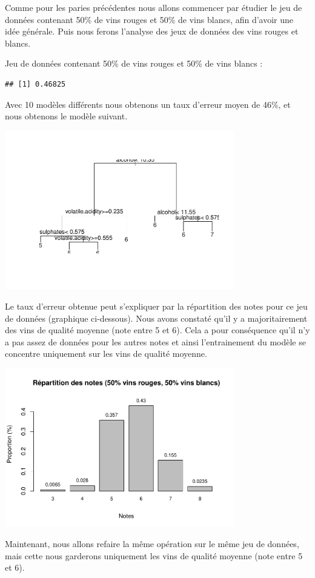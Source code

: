 \documentclass[
]{article}
\begin{document}
Comme pour les paries précédentes nous allons commencer par étudier le
jeu de données contenant 50\% de vins rouges et 50\% de vins blancs,
afin d'avoir une idée générale. Puis nous ferons l'analyse des jeux de
données des vins rouges et blancs.

Jeu de données contenant 50\% de vins rouges et 50\% de vins blancs :

\begin{verbatim}
## [1] 0.46825
\end{verbatim}

Avec 10 modèles différents nous obtenons un taux d'erreur moyen de 46\%,
et nous obtenons le modèle suivant.

\begin{center}
	\includegraphics[width=10cm]{repport_files/figure-latex/unnamed-chunk-17-1.pdf}
\end{center}

Le taux d'erreur obtenue peut s'expliquer par la répartition des notes
pour ce jeu de données (graphique ci-dessous). Nous avons constaté qu'il
y a majoritairement des vins de qualité moyenne (note entre 5 et 6).
Cela a pour conséquence qu'il n'y a pas assez de données pour les autres
notes et ainsi l'entrainement du modèle se concentre uniquement sur les
vins de qualité moyenne.

\begin{center}
	\includegraphics[width=10cm]{repport_files/figure-latex/unnamed-chunk-18-1.pdf}
\end{center}
Maintenant, nous allons refaire la même opération sur le même jeu de
données, mais cette nous garderons uniquement les vins de qualité
moyenne (note entre 5 et 6).
\end{document}
